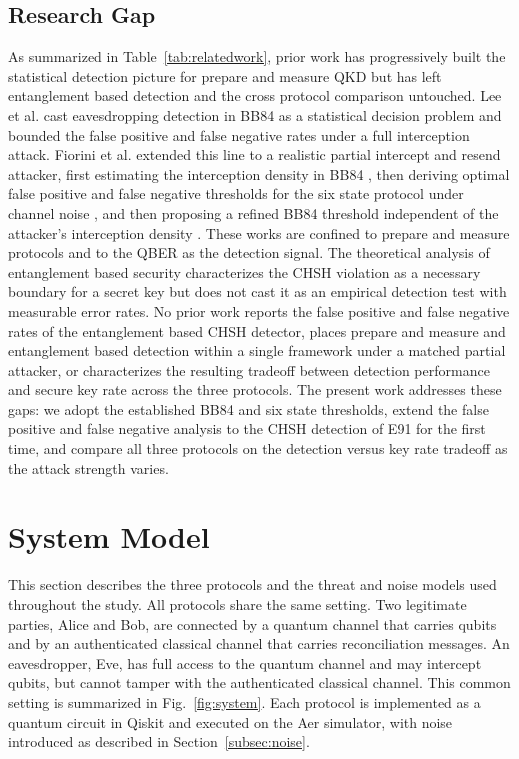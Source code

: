 \documentclass[conference]{IEEEtran}
\begin{document}
\subsection{Research Gap}
As summarized in Table~\ref{tab:relatedwork}, prior work has progressively built
the statistical detection picture for prepare and measure QKD but has left
entanglement based detection and the cross protocol comparison untouched. Lee et
al. \cite{lee2022eavesdropping} cast eavesdropping detection in BB84 as a
statistical decision problem and bounded the false positive and false negative
rates under a full interception attack. Fiorini et al. extended this line to a
realistic partial intercept and resend attacker, first estimating the
interception density in BB84 \cite{fiorini2024estimating}, then deriving optimal
false positive and false negative thresholds for the six state protocol under
channel noise \cite{fiorini2025sixstate}, and then proposing a refined BB84
threshold independent of the attacker's interception density
\cite{fiorini2026threshold}. These works are confined to prepare and measure
protocols and to the QBER as the detection signal. The theoretical analysis of
entanglement based security \cite{singh2021role} characterizes the CHSH
violation as a necessary boundary for a secret key but does not cast it as an
empirical detection test with measurable error rates. No prior work reports the
false positive and false negative rates of the entanglement based CHSH detector,
places prepare and measure and entanglement based detection within a single
framework under a matched partial attacker, or characterizes the resulting
tradeoff between detection performance and secure key rate across the three
protocols. The present work addresses these gaps: we adopt the established BB84
and six state thresholds, extend the false positive and false negative analysis
to the CHSH detection of E91 for the first time, and compare all three protocols
on the detection versus key rate tradeoff as the attack strength varies.

\section{System Model}
This section describes the three protocols and the threat and noise models used
throughout the study. All protocols share the same setting. Two legitimate
parties, Alice and Bob, are connected by a quantum channel that carries qubits
and by an authenticated classical channel that carries reconciliation messages.
An eavesdropper, Eve, has full access to the quantum channel and may intercept
qubits, but cannot tamper with the authenticated classical channel. This common setting is summarized in Fig.~\ref{fig:system}. Each
protocol is implemented as a quantum circuit in Qiskit and executed on the Aer
simulator, with noise introduced as described in Section~\ref{subsec:noise}.
\end{document}
